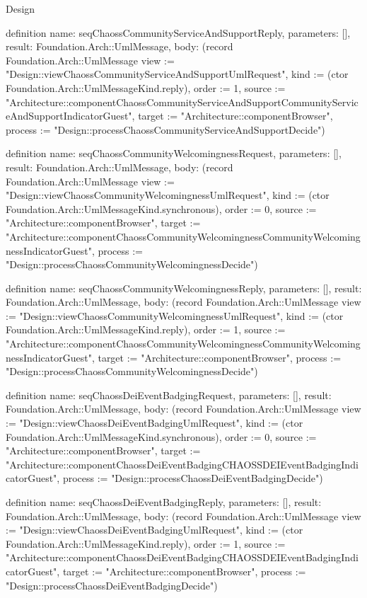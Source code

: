 \begin{lexlean}{Design}
\begin{semanticmodule}
definition{
  name: seqChaossCommunityServiceAndSupportReply,
  parameters: [],
  result: Foundation.Arch::UmlMessage,
  body: (record Foundation.Arch::UmlMessage {view := "Design::viewChaossCommunityServiceAndSupportUmlRequest", kind := (ctor Foundation.Arch::UmlMessageKind.reply), order := 1, source := "Architecture::componentChaossCommunityServiceAndSupportCommunityServiceAndSupportIndicatorGuest", target := "Architecture::componentBrowser", process := "Design::processChaossCommunityServiceAndSupportDecide"})
}

definition{
  name: seqChaossCommunityWelcomingnessRequest,
  parameters: [],
  result: Foundation.Arch::UmlMessage,
  body: (record Foundation.Arch::UmlMessage {view := "Design::viewChaossCommunityWelcomingnessUmlRequest", kind := (ctor Foundation.Arch::UmlMessageKind.synchronous), order := 0, source := "Architecture::componentBrowser", target := "Architecture::componentChaossCommunityWelcomingnessCommunityWelcomingnessIndicatorGuest", process := "Design::processChaossCommunityWelcomingnessDecide"})
}

definition{
  name: seqChaossCommunityWelcomingnessReply,
  parameters: [],
  result: Foundation.Arch::UmlMessage,
  body: (record Foundation.Arch::UmlMessage {view := "Design::viewChaossCommunityWelcomingnessUmlRequest", kind := (ctor Foundation.Arch::UmlMessageKind.reply), order := 1, source := "Architecture::componentChaossCommunityWelcomingnessCommunityWelcomingnessIndicatorGuest", target := "Architecture::componentBrowser", process := "Design::processChaossCommunityWelcomingnessDecide"})
}

definition{
  name: seqChaossDeiEventBadgingRequest,
  parameters: [],
  result: Foundation.Arch::UmlMessage,
  body: (record Foundation.Arch::UmlMessage {view := "Design::viewChaossDeiEventBadgingUmlRequest", kind := (ctor Foundation.Arch::UmlMessageKind.synchronous), order := 0, source := "Architecture::componentBrowser", target := "Architecture::componentChaossDeiEventBadgingCHAOSSDEIEventBadgingIndicatorGuest", process := "Design::processChaossDeiEventBadgingDecide"})
}

definition{
  name: seqChaossDeiEventBadgingReply,
  parameters: [],
  result: Foundation.Arch::UmlMessage,
  body: (record Foundation.Arch::UmlMessage {view := "Design::viewChaossDeiEventBadgingUmlRequest", kind := (ctor Foundation.Arch::UmlMessageKind.reply), order := 1, source := "Architecture::componentChaossDeiEventBadgingCHAOSSDEIEventBadgingIndicatorGuest", target := "Architecture::componentBrowser", process := "Design::processChaossDeiEventBadgingDecide"})
}


\end{semanticmodule}
\end{lexlean}
